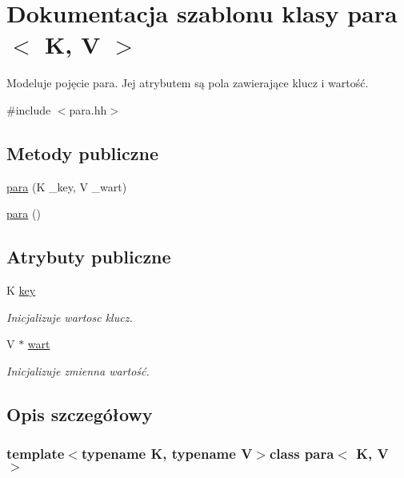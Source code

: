 \hypertarget{classpara}{\section{\-Dokumentacja szablonu klasy para$<$ \-K, \-V $>$}
\label{classpara}
}


\-Modeluje pojęcie para. \-Jej atrybutem są pola zawierające klucz i wartość.  




{\ttfamily \#include $<$para.\-hh$>$}

\subsection*{\-Metody publiczne}
\begin{DoxyCompactItemize}
\item 
\hyperlink{classpara_a08f42e24b676a1b46c6845f19415801b}{para} (\-K \-\_\-key, \-V \-\_\-wart)
\item 
\hyperlink{classpara_a887348c641347217f30b933bb9469770}{para} ()
\end{DoxyCompactItemize}
\subsection*{\-Atrybuty publiczne}
\begin{DoxyCompactItemize}
\item 
\-K \hyperlink{classpara_a6e7e0404e03a6aa1aebdb7cf6e981ca3}{key}
\begin{DoxyCompactList}\small\item\em \-Inicjalizuje wartosc klucz. \end{DoxyCompactList}\item 
\-V $\ast$ \hyperlink{classpara_a10ac672de7a450df5c04b65a78e9d1d4}{wart}
\begin{DoxyCompactList}\small\item\em \-Inicjalizuje zmienna wartość. \end{DoxyCompactList}\end{DoxyCompactItemize}


\subsection{\-Opis szczegółowy}
\subsubsection*{template$<$typename \-K, typename \-V$>$class para$<$ K, V $>$}



